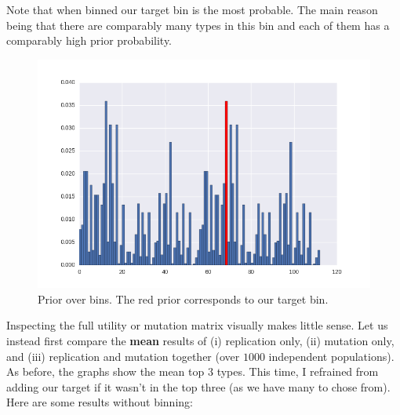 \documentclass[a4paper]{article}
\begin{document}
Note that when binned our target bin is the most probable. The main reason being that there are comparably many types in this bin and each of them has a comparably high prior probability.
\begin{figure}[h!]
  \centering
  \includegraphics[scale=.45]{../code-LOT-extension/plots/priors-binned-meFalse432.png} %
  \caption{Prior over bins. The red prior corresponds to our target bin.}
\end{figure}

\newpage
Inspecting the full utility or mutation matrix visually makes little sense. Let us instead first compare the {\bf mean} results of (i) replication only, (ii) mutation only, and (iii) replication and mutation together (over $1000$ independent populations). As before, the graphs show the mean top $3$ types. This time, I refrained from adding our target if it wasn't in the top three (as we have many to chose from). Here are some results without binning:
\end{document}
